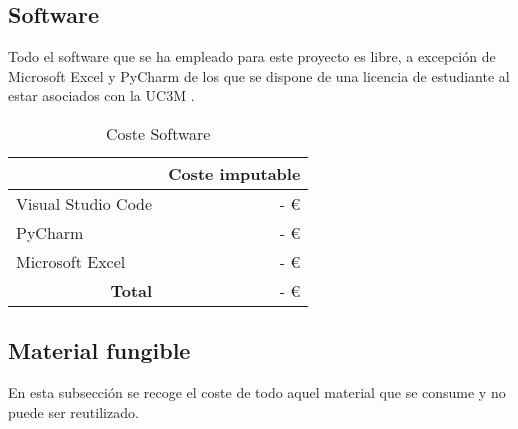 \subsection{Software}
Todo el software que se ha empleado para este proyecto es libre, a excepción de Microsoft Excel y PyCharm de los que se dispone de una licencia de estudiante al estar asociados con la UC3M \cite{microsoft_microsoft_nodate}.

\begin{table}[H]
	\centering
	\caption{Coste Software}
	\label{tab:coste_software}
	\begin{tabular}{l|r|}
		\hline
		\rowcolor[HTML]{BFBFBF}
		\multicolumn{1}{|c|}{\cellcolor[HTML]{BFBFBF}\textbf{Descripción}} & \multicolumn{1}{c|}{\cellcolor[HTML]{BFBFBF}\textbf{Coste imputable}} \\ \hline
		\multicolumn{1}{|l|}{Visual Studio Code}                           & -   €                                                                  \\ \hline
		\multicolumn{1}{|l|}{PyCharm}                                      & -   €                                                                  \\ \hline
		\multicolumn{1}{|l|}{Microsoft Excel}                              & -   €                                                                  \\ \hline
		\multicolumn{1}{r|}{\textbf{Total}}                                & -   €                                                                  \\ \cline{2-2}
	\end{tabular}
\end{table}

\subsection{Material fungible}
En esta subsección se recoge el coste de todo aquel material que se consume y no puede ser reutilizado.

